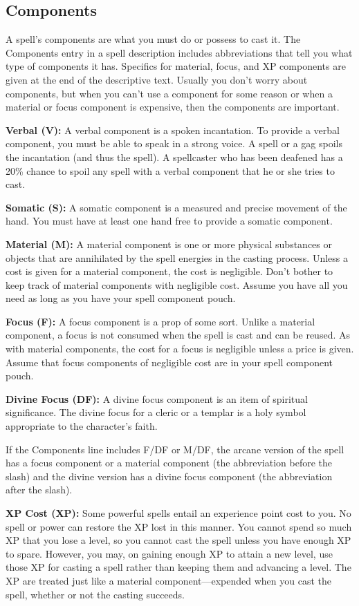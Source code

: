 \subsection{Components}
A spell's components are what you must do or possess to cast it. The Components entry in a spell description includes abbreviations that tell you what type of components it has. Specifics for material, focus, and XP components are given at the end of the descriptive text. Usually you don't worry about components, but when you can't use a component for some reason or when a material or focus component is expensive, then the components are important.

\textbf{Verbal (V):} A verbal component is a spoken incantation. To provide a verbal component, you must be able to speak in a strong voice. A  spell or a gag spoils the incantation (and thus the spell). A spellcaster who has been deafened has a 20\% chance to spoil any spell with a verbal component that he or she tries to cast.

\textbf{Somatic (S):} A somatic component is a measured and precise movement of the hand. You must have at least one hand free to provide a somatic component.

\textbf{Material (M):} A material component is one or more physical substances or objects that are annihilated by the spell energies in the casting process. Unless a cost is given for a material component, the cost is negligible. Don't bother to keep track of material components with negligible cost. Assume you have all you need as long as you have your spell component pouch.

\textbf{Focus (F):} A focus component is a prop of some sort. Unlike a material component, a focus is not consumed when the spell is cast and can be reused. As with material components, the cost for a focus is negligible unless a price is given. Assume that focus components of negligible cost are in your spell component pouch.

\textbf{Divine Focus (DF):} A divine focus component is an item of spiritual significance. The divine focus for a cleric or a templar is a holy symbol appropriate to the character's faith.

If the Components line includes F/DF or M/DF, the arcane version of the spell has a focus component or a material component (the abbreviation before the slash) and the divine version has a divine focus component (the abbreviation after the slash).

\textbf{XP Cost (XP):} Some powerful spells entail an experience point cost to you. No spell or power can restore the XP lost in this manner. You cannot spend so much XP that you lose a level, so you cannot cast the spell unless you have enough XP to spare. However, you may, on gaining enough XP to attain a new level, use those XP for casting a spell rather than keeping them and advancing a level. The XP are treated just like a material component---expended when you cast the spell, whether or not the casting succeeds.
